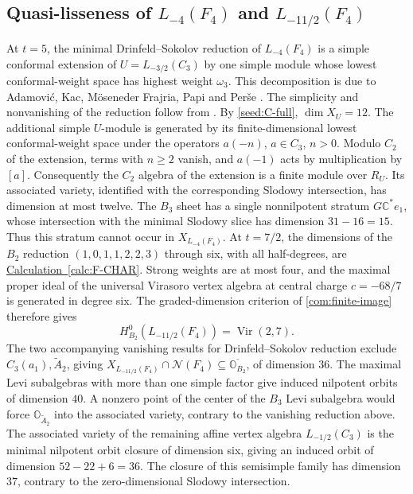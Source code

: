 \documentclass[11pt,a4paper]{amsart}
\numberwithin{equation}{section}
\theoremstyle{definition}
\theoremstyle{remark}
\newcommand{\C}{\mathbb C}
\newcommand{\N}{\mathcal N}
\newcommand{\OO}{\mathbb O}
\newcommand{\Vir}{\operatorname{Vir}}
\begin{document}
\subsection{\texorpdfstring{Quasi-lisseness of $L_{-4}(F_4)$ and $L_{-11/2}(F_4)$}{Quasi-lisseness of L-4(F4) and L-11/2(F4)}}
At $t=5$, the minimal Drinfeld--Sokolov reduction of $L_{-4}(F_4)$ is a simple conformal
extension of $U=L_{-3/2}(C_3)$ by one simple module whose lowest
conformal-weight space has highest weight $\omega_3$. This decomposition
is due to Adamovi\'c, Kac, M\"oseneder Frajria, Papi and Per\v se
\cite[Theorem~6.8]{AdamovicEtAl2017}. The simplicity and nonvanishing of the reduction
follow from \cite[Theorem~6.2]{ArakawaMoreau2017}.
By \cref{seed:C-full}, $\dim X_U=12$. The additional simple
$U$-module is generated by its finite-dimensional lowest
conformal-weight space under the operators $a(-n)$, $a\in C_3$,
$n>0$. Modulo $C_2$ of the extension, terms with $n\ge2$ vanish,
and $a(-1)$ acts by multiplication by $[a]$. Consequently the
$C_2$ algebra of the extension is a finite module over $R_U$.
Its associated variety, identified with the corresponding Slodowy intersection, has dimension
at most twelve. The $B_3$ sheet has a single nonnilpotent stratum
$G\C^*e_1$, whose intersection with the minimal Slodowy slice has
dimension $31-16=15$. Thus this stratum cannot occur in $X_{L_{-4}(F_4)}$.
At $t=7/2$, the dimensions of the $B_2$ reduction
$(1,0,1,1,2,2,3)$ through six, with all half-degrees, are
\hyperref[calc:F-CHAR]{Calculation~\ref*{calc:F-CHAR}}. Strong weights are at most four, and the
maximal proper ideal of the universal Virasoro vertex algebra at central charge $c=-68/7$ is generated in degree six.
The graded-dimension criterion of \cref{com:finite-image} therefore gives
\begin{equation}\label{seed:F7actual}
H^0_{B_2}(L_{-11/2}(F_4))=\Vir(2,7).
\end{equation}
The two accompanying vanishing results for Drinfeld--Sokolov reduction exclude $C_3(a_1),\widetilde A_2$,
giving $X_{L_{-11/2}(F_4)}\cap\N(F_4)\subseteq\overline{\OO_{B_2}}$,
of dimension $36$. The maximal Levi subalgebras with more than one
simple factor give induced nilpotent orbits of dimension $40$.
A nonzero point of the center of the $B_3$ Levi subalgebra would force
$\OO_{\widetilde A_2}$ into the associated variety, contrary to the
vanishing reduction above. The associated variety of the remaining
affine vertex algebra $L_{-1/2}(C_3)$ is the minimal nilpotent orbit
closure of dimension six, giving an induced orbit of dimension $52-22+6=36$.
The closure of this semisimple family has dimension $37$, contrary
to the zero-dimensional Slodowy intersection.
\end{document}
